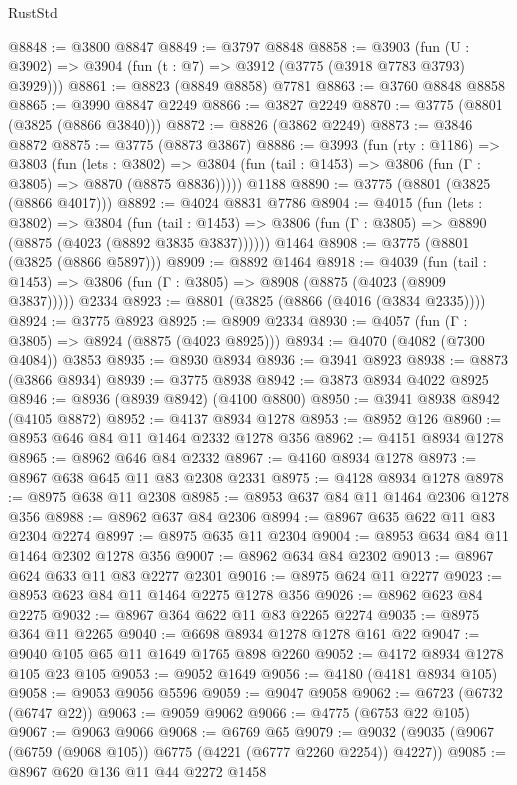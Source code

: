 \begin{lexlean}{RustStd}
\begin{coremodule}
{\begin{coremodule}
{{{{{{{{{{{{{{{{{{{{{{{{{{{{{{{@8848 := @3800 @8847
@8849 := @3797 @8848
@8858 := @3903 (fun (U : @3902) => @3904 (fun (t : @7) => @3912 (@3775 (@3918 @7783 @3793) @3929)))
@8861 := @8823 (@8849 @8858) @7781
@8863 := @3760 @8848 @8858
@8865 := @3990 @8847 @2249
@8866 := @3827 @2249
@8870 := @3775 (@8801 (@3825 (@8866 @3840)))
@8872 := @8826 (@3862 @2249)
@8873 := @3846 @8872
@8875 := @3775 (@8873 @3867)
@8886 := @3993
    (fun (rty : @1186) =>
    @3803
      (fun (lets : @3802) =>
      @3804 (fun (tail : @1453) => @3806 (fun (Γ : @3805) => @8870 (@8875 @8836)))))
    @1188
@8890 := @3775 (@8801 (@3825 (@8866 @4017)))
@8892 := @4024 @8831 @7786
@8904 := @4015
    (fun (lets : @3802) =>
    @3804
      (fun (tail : @1453) => @3806 (fun (Γ : @3805) => @8890 (@8875 (@4023 (@8892 @3835 @3837))))))
    @1464
@8908 := @3775 (@8801 (@3825 (@8866 @5897)))
@8909 := @8892 @1464
@8918 := @4039
    (fun (tail : @1453) => @3806 (fun (Γ : @3805) => @8908 (@8875 (@4023 (@8909 @3837)))))
    @2334
@8923 := @8801 (@3825 (@8866 (@4016 (@3834 @2335))))
@8924 := @3775 @8923
@8925 := @8909 @2334
@8930 := @4057 (fun (Γ : @3805) => @8924 (@8875 (@4023 @8925)))
@8934 := @4070 (@4082 (@7300 @4084)) @3853
@8935 := @8930 @8934
@8936 := @3941 @8923
@8938 := @8873 (@3866 @8934)
@8939 := @3775 @8938
@8942 := @3873 @8934 @4022 @8925
@8946 := @8936 (@8939 @8942) (@4100 @8800)
@8950 := @3941 @8938 @8942 (@4105 @8872)
@8952 := @4137 @8934 @1278
@8953 := @8952 @126
@8960 := @8953 @646 @84 @11 @1464 @2332 @1278 @356
@8962 := @4151 @8934 @1278
@8965 := @8962 @646 @84 @2332
@8967 := @4160 @8934 @1278
@8973 := @8967 @638 @645 @11 @83 @2308 @2331
@8975 := @4128 @8934 @1278
@8978 := @8975 @638 @11 @2308
@8985 := @8953 @637 @84 @11 @1464 @2306 @1278 @356
@8988 := @8962 @637 @84 @2306
@8994 := @8967 @635 @622 @11 @83 @2304 @2274
@8997 := @8975 @635 @11 @2304
@9004 := @8953 @634 @84 @11 @1464 @2302 @1278 @356
@9007 := @8962 @634 @84 @2302
@9013 := @8967 @624 @633 @11 @83 @2277 @2301
@9016 := @8975 @624 @11 @2277
@9023 := @8953 @623 @84 @11 @1464 @2275 @1278 @356
@9026 := @8962 @623 @84 @2275
@9032 := @8967 @364 @622 @11 @83 @2265 @2274
@9035 := @8975 @364 @11 @2265
@9040 := @6698 @8934 @1278 @1278 @161 @22
@9047 := @9040 @105 @65 @11 @1649 @1765 @898 @2260
@9052 := @4172 @8934 @1278 @105 @23 @105
@9053 := @9052 @1649
@9056 := @4180 (@4181 @8934 @105)
@9058 := @9053 @9056 @5596
@9059 := @9047 @9058
@9062 := @6723 (@6732 (@6747 @22))
@9063 := @9059 @9062
@9066 := @4775 (@6753 @22 @105)
@9067 := @9063 @9066
@9068 := @6769 @65
@9079 := @9032 (@9035 (@9067 (@6759 (@9068 @105)) @6775 (@4221 (@6777 @2260 @2254)) @4227))
@9085 := @8967 @620 @136 @11 @44 @2272 @1458
}}}}}}}}}}}}}}}}}}}}}}}}}}}}}}}
\end{coremodule}}
\end{coremodule}
\end{lexlean}
